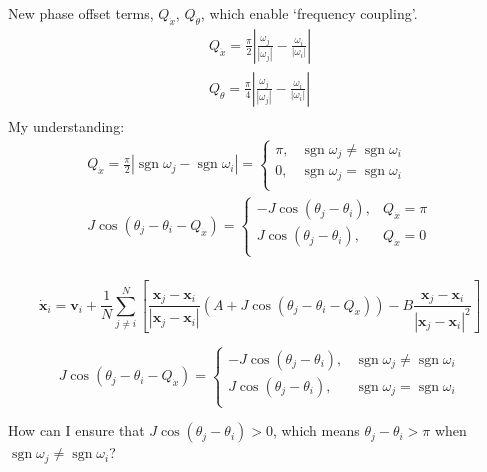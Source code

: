 \documentclass[10pt,aspectratio=43,mathserif,table]{beamer}
\begin{document}
\begin{frame}
    New phase offset terms, $Q_{\dot{x}}$, $Q_{\dot{\theta}}$, which enable ‘frequency coupling’.
    $$
    \begin{array}{c}
        Q_{\dot{x}}=\frac{\pi}{2}\left| \frac{\omega _j}{\left| \omega _j \right|}-\frac{\omega _i}{\left| \omega _i \right|} \right|\\
        Q_{\dot{\theta}}=\frac{\pi}{4}\left| \frac{\omega _j}{\left| \omega _j \right|}-\frac{\omega _i}{\left| \omega _i \right|} \right|\\
    \end{array}
    $$
    My understanding: 
    $$
    \begin{array}{c}
    Q_{\dot{x}}=\frac{\pi}{2}\left| \operatorname{sgn} \omega _j-\operatorname{sgn} \omega _i \right|=\begin{cases}
    \pi ,&		\operatorname{sgn} \omega _j\ne\operatorname{sgn} \omega _i\\
    0,&		\operatorname{sgn} \omega _j= \operatorname{sgn} \omega _i\\
    \end{cases}\\
    J\cos \left( \theta _j-\theta _i-Q_{\dot{x}} \right) =\begin{cases}
    -J\cos \left( \theta _j-\theta _i \right) ,&		Q_{\dot{x}}=\pi\\
    J\cos \left( \theta _j-\theta _i \right) ,&		Q_{\dot{x}}=0\\
    \end{cases}\\
    \end{array}
    $$
    
    
\end{frame}

\begin{frame}
    $$
    \dot{\mathbf{x}}_i=\mathbf{v}_i+\frac{1}{N}\sum_{j\ne i}^N{\left[ \frac{\mathbf{x}_j-\mathbf{x}_i}{\left| \mathbf{x}_j-\mathbf{x}_i \right|}\left( A+J\cos \left( \theta _j-\theta _i-Q_{\dot{x}} \right) \right) -B\frac{\mathbf{x}_j-\mathbf{x}_i}{\left| \mathbf{x}_j-\mathbf{x}_i \right|^2} \right]}
    $$

    $$
    J\cos \left( \theta _j-\theta _i-Q_{\dot{x}} \right) =\begin{cases}
        -J\cos \left( \theta _j-\theta _i \right) ,&		\operatorname{sgn} \omega _j\ne\operatorname{sgn} \omega _i\\
        J\cos \left( \theta _j-\theta _i \right) ,&		\operatorname{sgn} \omega _j= \operatorname{sgn} \omega _i\\
    \end{cases}
    $$
    \newline

    How can I ensure that $J\cos \left( \theta _j-\theta _i \right) > 0$, which means $\theta _j-\theta _i > \pi$ when $\operatorname{sgn} \omega _j\ne\operatorname{sgn} \omega _i$?
\end{frame}

\end{document}
